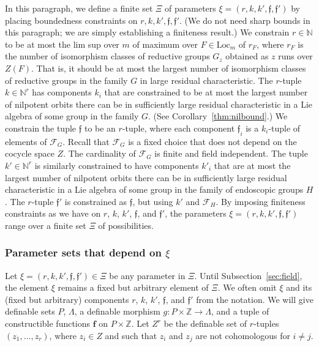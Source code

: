 \documentclass[12pt]{amsart}
\newcommand{\ring}[1]{{\mathbb #1}}
\def\s{{\mathfrak{f}}}
\def\bf{\mathbf f}
\newcommand{\cF}{\mathcal{F}}
\newcommand{\Loc}{\mathrm{Loc}}
\theoremstyle{plain}
\theoremstyle{definition}
\begin{document}
In this paragraph, we define a finite set $\Xi$ of parameters
$\xi=(r,k,k',\s,\s')$ by placing boundedness constraints on
$r,k,k',\s,\s'$.  (We do not need sharp bounds in this paragraph; we
are simply establishing a finiteness result.)  We constrain
$r\in\ring{N}$ to be at most the lim sup over $m$ of maximum over
$F\in\Loc_m$ of $r_F$, where $r_F$ is the number of isomorphism
classes of reductive groups $G_z$ obtained as $z$ runs over $Z(F)$.
That is, it should be at most the largest number of isomorphism
classes of reductive groups in the family $G$ in large residual
characteristic.  The $r$-tuple $k\in\ring{N}^r$ has components $k_i$
that are constrained to be at most the largest number of nilpotent
orbits there can be in sufficiently large residual characteristic in a
Lie algebra of some group in the family $G$.  (See
Corollary~\ref{thm:nilbound}.) We constrain the tuple $\s$ to be an
$r$-tuple, where each component $\s_i$ is a $k_i$-tuple of elements of
$\cF_G$. Recall that $\cF_G$ is a fixed choice that does not depend on
the cocycle space $Z$.  The cardinality of $\cF_G$ is finite and field
independent.  The tuple $k'\in\ring{N}^r$ is similarly constrained to
have components $k'_i$ that are at most the largest number of
nilpotent orbits there can be in sufficiently large residual
characteristic in a Lie algebra of some group in the family of
endoscopic groups $H$.  The $r$-tuple $\s'$ is constrained as $\s$,
but using $k'$ and $\cF_H$.  By imposing finiteness constraints as we
have on $r$, $k$, $k'$, $\s$, and $\s'$, the parameters
$\xi=(r,k,k',\s,\s')$ range over a finite set $\Xi$ of possibilities.

\subsubsection{Parameter sets that depend on $\xi$}

Let $\xi=(r,k,k',\s,\s')\in\Xi$ be any parameter in
$\Xi$.  Until Subsection~\ref{sec:field}, the element $\xi$ remains
a fixed but arbitrary element of $\Xi$.  We often omit $\xi$ and its
(fixed but arbitrary) components $r$, $k$, $k'$, $\s$, and $\s'$ from
the notation.  We will give definable sets $P$, $\Lambda$, a definable
morphism $g:P\times\ring{Z}\to \Lambda$, and a tuple of constructible
functions $\bf$ on $P\times\ring{Z}$.  Let $Z^r$ be the definable set
of $r$-tuples $(z_1,\ldots,z_r)$, where $z_i \in Z$ and such that
$z_i$ and $z_j$ are not cohomologous for $i\ne j$.
\end{document}
